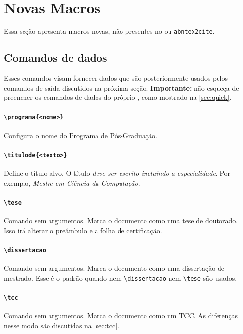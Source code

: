 \documentclass[embeddedlogo]{../ufsc-thesis-rn46-2019}
\newcommand{\lacmd}[1]{\texttt{\textbackslash{}#1}}
\begin{document}
\section{Novas Macros}

Essa seção apresenta macros novas, não presentes no \abnTeX{} ou
\texttt{abntex2cite}.

\subsection{Comandos de dados}
\label{sec:dados}

Esses comandos visam fornecer dados que são posteriormente usados pelos
comandos de saída discutidos na próxima seção. \textbf{Importante:} não esqueça
de preencher os comandos de dados do próprio \abnTeX, como mostrado na
\autoref{sec:quick}.

\paragraph*{\lacmd{programa\{<nome>\}}} Configura o nome do Programa de
Pós-Graduação.

\paragraph*{\lacmd{titulode\{<texto>\}}} Define o título alvo.  O título
\textit{deve ser escrito incluindo a especialidade}. Por exemplo, \emph{Mestre
  em Ciência da Computação}.

\paragraph*{\lacmd{tese}} Comando sem argumentos. Marca o documento como uma
tese de doutorado. Isso irá alterar o preâmbulo e a folha de certificação.

\paragraph*{\lacmd{dissertacao}} Comando sem argumentos. Marca o documento como
uma dissertação de mestrado. Esse é o padrão quando nem \lacmd{dissertacao} nem
\lacmd{tese} são usados.

\paragraph*{\lacmd{tcc}} Comando sem argumentos. Marca o documento como um
TCC. As diferenças nesse modo são discutidas na \autoref{sec:tcc}.
\end{document}
